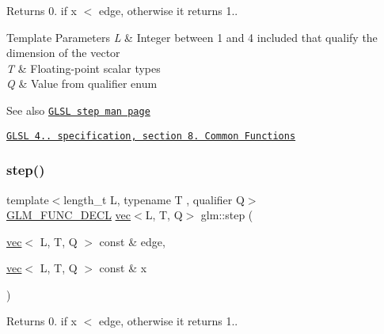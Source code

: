 Returns 0. if x $<$ edge, otherwise it returns 1..


\begin{DoxyTemplParams}{Template Parameters}
{\em L} & Integer between 1 and 4 included that qualify the dimension of the vector \\
\hline
{\em T} & Floating-\/point scalar types \\
\hline
{\em Q} & Value from qualifier enum\\
\hline
\end{DoxyTemplParams}
\begin{DoxySeeAlso}{See also}
\href{http://www.opengl.org/sdk/docs/manglsl/xhtml/step.xml}{\tt G\+L\+SL step man page} 

\href{http://www.opengl.org/registry/doc/GLSLangSpec.4.20.8.pdf}{\tt G\+L\+SL 4.. specification, section 8. Common Functions} 
\end{DoxySeeAlso}
\mbox{\label{group__core__func__common_gaf4a5fc81619c7d3e8b22f53d4a098c7f}} 
\subsubsection{\texorpdfstring{step()}{step()}\hspace{0.1cm}{\footnotesize\ttfamily [3/3]}}
{\footnotesize\ttfamily template$<$length\+\_\+t L, typename T , qualifier Q$>$ \\
\hyperlink{setup_8hpp_ab2d052de21a70539923e9bcbf6e83a51}{G\+L\+M\+\_\+\+F\+U\+N\+C\+\_\+\+D\+E\+CL} \hyperlink{structglm_1_1vec}{vec}$<$L, T, Q$>$ glm\+::step (\begin{DoxyParamCaption}\item[{\hyperlink{structglm_1_1vec}{vec}$<$ L, T, Q $>$ const \&}]{edge,  }\item[{\hyperlink{structglm_1_1vec}{vec}$<$ L, T, Q $>$ const \&}]{x }\end{DoxyParamCaption})}

Returns 0. if x $<$ edge, otherwise it returns 1..


